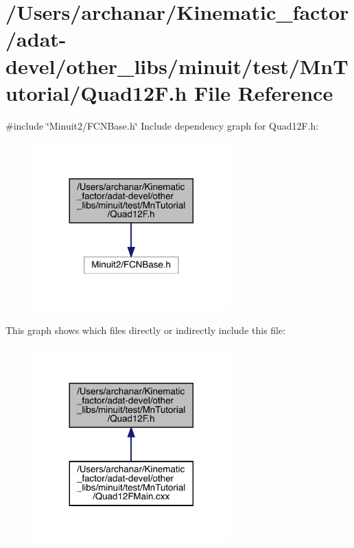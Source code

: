 \hypertarget{adat-devel_2other__libs_2minuit_2test_2MnTutorial_2Quad12F_8h}{}\section{/\+Users/archanar/\+Kinematic\+\_\+factor/adat-\/devel/other\+\_\+libs/minuit/test/\+Mn\+Tutorial/\+Quad12F.h File Reference}
\label{adat-devel_2other__libs_2minuit_2test_2MnTutorial_2Quad12F_8h}
{\ttfamily \#include \char`\"{}Minuit2/\+F\+C\+N\+Base.\+h\char`\"{}}\newline
Include dependency graph for Quad12\+F.\+h\+:
\nopagebreak
\begin{figure}[H]
\begin{center}
\leavevmode
\includegraphics[width=215pt]{d3/d84/adat-devel_2other__libs_2minuit_2test_2MnTutorial_2Quad12F_8h__incl}
\end{center}
\end{figure}
This graph shows which files directly or indirectly include this file\+:
\nopagebreak
\begin{figure}[H]
\begin{center}
\leavevmode
\includegraphics[width=215pt]{da/d4c/adat-devel_2other__libs_2minuit_2test_2MnTutorial_2Quad12F_8h__dep__incl}
\end{center}
\end{figure}
